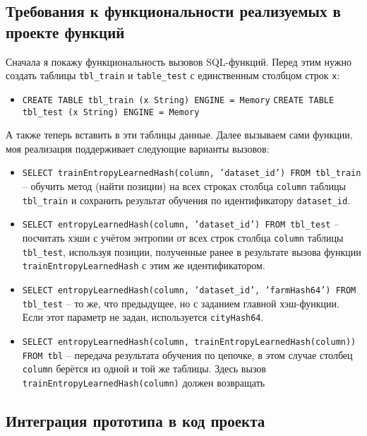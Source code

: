 \documentclass[a4paper,12pt]{extarticle}
\begin{document}
\begin{sloppypar}
\subsection{Требования к функциональности реализуемых в проекте функций}

Сначала я покажу функциональность вызовов SQL-функций. Перед этим нужно создать таблицы \texttt{tbl\_train} и \texttt{table\_test} с единственным столбцом строк \texttt{x}:

\begin{itemize}
	\item \texttt{CREATE TABLE tbl\_train (x String) ENGINE = Memory} \newline \texttt{CREATE TABLE tbl\_test (x String) ENGINE = Memory}
\end{itemize}

А также теперь вставить в эти таблицы данные. Далее вызываем сами функции, моя реализация поддерживает следующие варианты вызовов:

\begin{itemize}
	\item \texttt{SELECT trainEntropyLearnedHash(column, 'dataset\_id') FROM tbl\_train} -- обучить метод (найти позиции) на всех строках столбца \texttt{column} таблицы \texttt{tbl\_train} и сохранить результат обучения по идентификатору \texttt{dataset\_id}.

	\item \texttt{SELECT entropyLearnedHash(column, 'dataset\_id') FROM tbl\_test} -- посчитать хэши с учётом энтропии от всех строк столбца \texttt{column} таблицы \texttt{tbl\_test}, используя позиции, полученные ранее в результате вызова функции \texttt{trainEntropyLearnedHash} с этим же идентификатором.

	\item \texttt{SELECT entropyLearnedHash(column, 'dataset\_id', 'farmHash64') FROM tbl\_test} -- то же, что предыдущее, но с заданием главной хэш-функции. Если этот параметр не задан, используется \texttt{cityHash64}. 
	
	\item \texttt{SELECT entropyLearnedHash(column, trainEntropyLearnedHash(column)) FROM tbl} -- передача результата обучения по цепочке, в этом случае столбец \texttt{column} берётся из одной и той же таблицы. Здесь вызов \texttt{trainEntropyLearnedHash(column)} должен возвращать
\end{itemize}

\subsection{Интеграция прототипа в код проекта}


\end{sloppypar}
\end{document}
